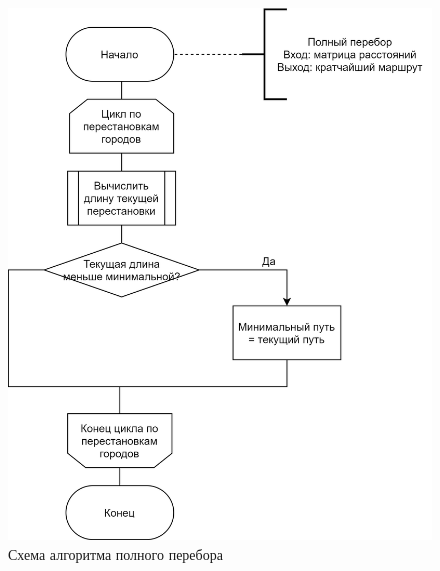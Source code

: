 \documentclass[12pt]{report}
\begin{document}
\begin{figure}[H]
		\centering
		\includegraphics[scale=0.7]{report_files/dg-brute.png}
		\caption{Схема алгоритма полного перебора}
		\label{fig:bruteforce}
\end{figure}
\end{document}
